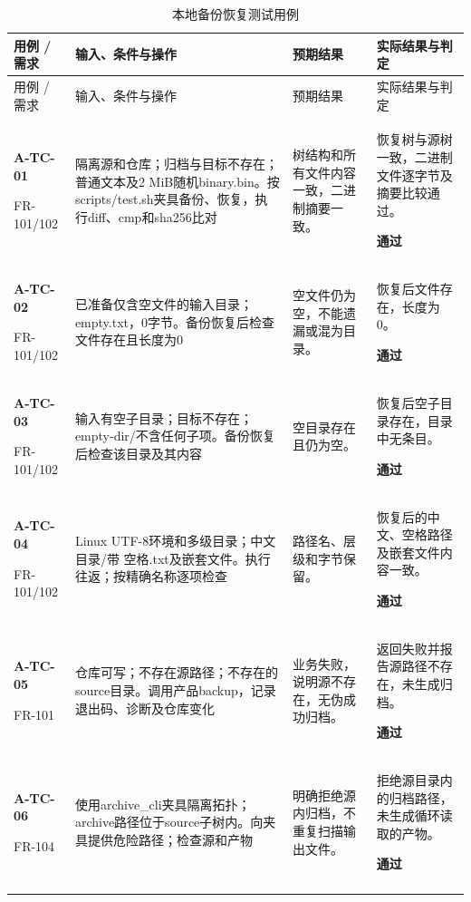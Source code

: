 \begingroup
\normalsize
\setlength{\tabcolsep}{4pt}
\renewcommand{\arraystretch}{1.16}
\begin{longtable}{@{}L{.14\linewidth}L{.36\linewidth}L{.21\linewidth}L{.23\linewidth}@{}}
\caption{本地备份恢复测试用例}\label{tab:test-1}\\
\toprule 用例 / 需求 & 输入、条件与操作 & 预期结果 & 实际结果与判定\\\midrule\endfirsthead
\toprule 用例 / 需求 & 输入、条件与操作 & 预期结果 & 实际结果与判定\\\midrule\endhead
\bottomrule\endfoot
\textbf{A-TC-01}\par{\footnotesize FR-101/102} & 隔离源和仓库；归档与目标不存在；普通文本及2 MiB随机binary.bin。按scripts/test.sh夹具备份、恢复，执行diff、cmp和sha256比对 & 树结构和所有文件内容一致，二进制摘要一致。 & 恢复树与源树一致，二进制文件逐字节及摘要比较通过。\par\textbf{通过}\\\addlinespace[2pt]
\textbf{A-TC-02}\par{\footnotesize FR-101/102} & 已准备仅含空文件的输入目录；empty.txt，0字节。备份恢复后检查文件存在且长度为0 & 空文件仍为空，不能遗漏或混为目录。 & 恢复后文件存在，长度为0。\par\textbf{通过}\\\addlinespace[2pt]
\textbf{A-TC-03}\par{\footnotesize FR-101/102} & 输入有空子目录；目标不存在；empty-dir/不含任何子项。备份恢复后检查该目录及其内容 & 空目录存在且仍为空。 & 恢复后空子目录存在，目录中无条目。\par\textbf{通过}\\\addlinespace[2pt]
\textbf{A-TC-04}\par{\footnotesize FR-101/102} & Linux UTF-8环境和多级目录；中文目录/带 空格.txt及嵌套文件。执行往返；按精确名称逐项检查 & 路径名、层级和字节保留。 & 恢复后的中文、空格路径及嵌套文件内容一致。\par\textbf{通过}\\\addlinespace[2pt]
\textbf{A-TC-05}\par{\footnotesize FR-101} & 仓库可写；不存在源路径；不存在的source目录。调用产品backup，记录退出码、诊断及仓库变化 & 业务失败，说明源不存在，无伪成功归档。 & 返回失败并报告源路径不存在，未生成归档。\par\textbf{通过}\\\addlinespace[2pt]
\textbf{A-TC-06}\par{\footnotesize FR-104} & 使用archive\_cli夹具隔离拓扑；archive路径位于source子树内。向夹具提供危险路径；检查源和产物 & 明确拒绝源内归档，不重复扫描输出文件。 & 拒绝源目录内的归档路径，未生成循环读取的产物。\par\textbf{通过}\\\addlinespace[2pt]

\end{longtable}
